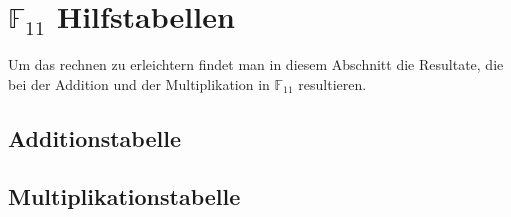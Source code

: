 %
%
%
\section{$\mathbb{F}_{11}$ Hilfstabellen
	\label{reedsolomon:section:hilfstabellen}}

Um das rechnen  zu erleichtern findet man in diesem Abschnitt die Resultate, die bei der Addition und der Multiplikation in $\mathbb{F}_{11}$ resultieren.

\subsection{Additionstabelle
	\label{reedsolomon:subsection:adtab}}	


\subsection{Multiplikationstabelle
	\label{reedsolomon:subsection:mptab}}
